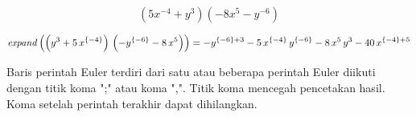 \documentclass[a4paper,10pt]{article}
\begin{document}
\begin{eulernotebook}
\begin{eulercomment}
\begin{eulercomment}
\begin{eulercomment}
\end{eulercomment}
\begin{eulerformula}
\[
(5x^{-4}+y^3) (-8x^5-y^{-6})
\]
\end{eulerformula}
\begin{eulerformula}
\[
{\it expand}\left(\left(y^3+5\,x^{\left \{-4 \right \}}\right)\,  \left(-y^{\left \{-6 \right \}}-8\,x^5\right)\right)=-y^{\left \{-6   \right \}+3}-5\,x^{\left \{-4 \right \}}\,y^{\left \{-6 \right \}}-  8\,x^5\,y^3-40\,x^{\left \{-4 \right \}+5}
\]
\end{eulerformula}
\begin{eulercomment}
Baris perintah Euler terdiri dari satu atau beberapa perintah Euler
diikuti dengan titik koma ";" atau koma ",". Titik koma mencegah
pencetakan hasil. Koma setelah perintah terakhir dapat dihilangkan.


\end{eulercomment}
\end{eulercomment}
\end{eulercomment}
\end{eulernotebook}
\end{document}
